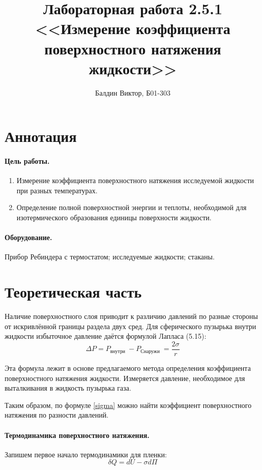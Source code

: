 \documentclass[12pt]{article}
\title{ 
    Лабораторная работа 2.5.1 \\
    <<Измерение коэффициента поверхностного натяжения жидкости>>
}
\author{Балдин Виктор, Б01-303}
\begin{document}
    \maketitle
    \section{Аннотация}
    \paragraph{Цель работы.}
    \begin{enumerate}
        \item Измерение коэффициента поверхностного натяжения исследуемой 
        жидкости при разных температурах.
        \item Определение полной поверхностной энергии и теплоты, необходимой
        для изотермического образования единицы поверхности жидкости.
    \end{enumerate}
    \paragraph{Оборудование.}
    Прибор Ребиндера с термостатом; исследуемые жидкости; стаканы.
    
    \section{Теоретическая часть}
    Наличие поверхностного слоя приводит к различию давлений по разные стороны
    от искривлённой границы раздела двух сред. Для сферического пузырька внутри
    жидкости избыточное давление даётся формулой Лапласа (5.15):
    \begin{equation}
        \Delta P=P_{\text {внутри }}-P_{\text {Снаружи }}=\frac{2 \sigma}{r}
        \label{sigma}
    \end{equation}

    Эта формула лежит в основе предлагаемого метода определения коэффициента
    поверхностного натяжения жидкости. Измеряется давление, необходимое для
    выталкивания в жидкость пузырька газа.
    
    Таким образом, по формуле \ref{sigma} можно найти коэффициент 
    поверхностного натяжения по разности давлений.

    \paragraph{Термодинамика поверхностного натяжения.}
    Запишем первое начало термодинамики для пленки:
    \begin{equation}
        \delta Q = dU - \sigma d\Pi
    \end{equation}
    
\end{document}
